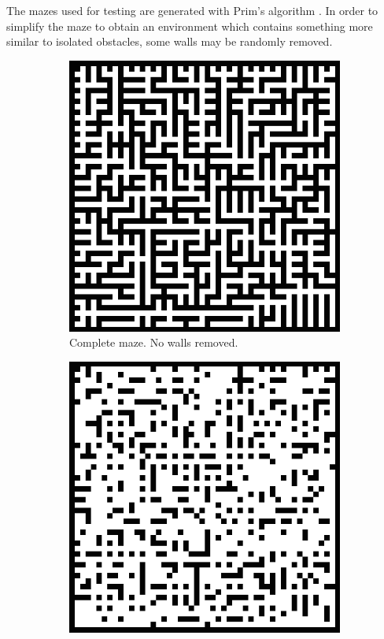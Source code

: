 \documentclass{article}
\begin{document}
The mazes used for testing are generated with Prim's algorithm
\cite{prim1957shortest}. In order to simplify the maze to obtain an environment
which contains something more similar to isolated obstacles, some walls may be
randomly removed.

\begin{figure}[H]
    \centering
    \begin{subfigure}[b]{0.3\textwidth}
        \includegraphics[width=\textwidth]{./maze_easyfy_1.png}
        \caption{Complete maze. No walls removed.}
    \end{subfigure}
    \quad \quad
    \begin{subfigure}[b]{0.3\textwidth}
        \includegraphics[width=\textwidth]{./maze_easyfy_05.png}

\end{subfigure}
\end{figure}
\end{document}
